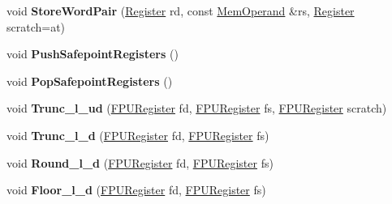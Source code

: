 \begin{DoxyCompactItemize}
void {\bfseries Store\+Word\+Pair} (\mbox{\hyperlink{classv8_1_1internal_1_1Register}{Register}} rd, const \mbox{\hyperlink{classv8_1_1internal_1_1MemOperand}{Mem\+Operand}} \&rs, \mbox{\hyperlink{classv8_1_1internal_1_1Register}{Register}} scratch=at)
\item 
\mbox{\label{classv8_1_1internal_1_1MacroAssembler_aca545d9193d7a468e285a5ba66fb6f19}} 
void {\bfseries Push\+Safepoint\+Registers} ()
\item 
\mbox{\label{classv8_1_1internal_1_1MacroAssembler_accf004371b050ef53eb57724f4d8d8b1}} 
void {\bfseries Pop\+Safepoint\+Registers} ()
\item 
\mbox{\label{classv8_1_1internal_1_1MacroAssembler_a44d4c971988924b08a362e00947162b0}} 
void {\bfseries Trunc\+\_\+l\+\_\+ud} (\mbox{\hyperlink{classv8_1_1internal_1_1FPURegister}{F\+P\+U\+Register}} fd, \mbox{\hyperlink{classv8_1_1internal_1_1FPURegister}{F\+P\+U\+Register}} fs, \mbox{\hyperlink{classv8_1_1internal_1_1FPURegister}{F\+P\+U\+Register}} scratch)
\item 
\mbox{\label{classv8_1_1internal_1_1MacroAssembler_a1e37c4497b18049d934528ee8a3a2bcd}} 
void {\bfseries Trunc\+\_\+l\+\_\+d} (\mbox{\hyperlink{classv8_1_1internal_1_1FPURegister}{F\+P\+U\+Register}} fd, \mbox{\hyperlink{classv8_1_1internal_1_1FPURegister}{F\+P\+U\+Register}} fs)
\item 
\mbox{\label{classv8_1_1internal_1_1MacroAssembler_aca800042026aa47c44ed18bbad386d06}} 
void {\bfseries Round\+\_\+l\+\_\+d} (\mbox{\hyperlink{classv8_1_1internal_1_1FPURegister}{F\+P\+U\+Register}} fd, \mbox{\hyperlink{classv8_1_1internal_1_1FPURegister}{F\+P\+U\+Register}} fs)
\item 
\mbox{\label{classv8_1_1internal_1_1MacroAssembler_a32433c04c68f5312086c538201f5edbe}} 
void {\bfseries Floor\+\_\+l\+\_\+d} (\mbox{\hyperlink{classv8_1_1internal_1_1FPURegister}{F\+P\+U\+Register}} fd, \mbox{\hyperlink{classv8_1_1internal_1_1FPURegister}{F\+P\+U\+Register}} fs)
\item 
\mbox{\label{classv8_1_1internal_1_1MacroAssembler_a27c699e0690ad0a7acadff3ca3ed016f}} 

\end{DoxyCompactItemize}
